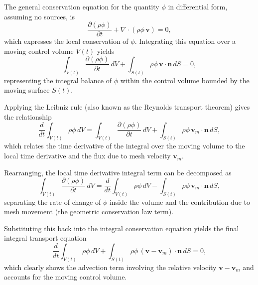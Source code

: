 \documentclass[12pt]{extarticle}
\newcommand{\<}{\langle}
\renewcommand{\>}{\rangle}
\theoremstyle{definition}
\begin{document}
The general conservation equation for the quantity \(\phi\) in differential form, assuming no sources, is
\begin{equation}
\frac{\partial (\rho \phi)}{\partial t} + \nabla \cdot (\rho \phi \, \textbf{v}) = 0,
\end{equation}
which expresses the local conservation of \(\phi\). Integrating this equation over a moving control volume \(V(t)\) yields
\begin{equation}
\int_{V(t)} \frac{\partial (\rho \phi)}{\partial t} \, dV + \int_{S(t)} \rho \phi \, \textbf{v} \cdot \textbf{n} \, dS = 0,
\end{equation}
representing the integral balance of \(\phi\) within the control volume bounded by the moving surface \(S(t)\).

Applying the Leibniz rule (also known as the Reynolds transport theorem) gives the relationship
\begin{equation}
\frac{d}{dt} \int_{V(t)} \rho \phi \, dV = \int_{V(t)} \frac{\partial (\rho \phi)}{\partial t} \, dV + \int_{S(t)} \rho \phi \, \textbf{v}_m \cdot \textbf{n} \, dS,
\end{equation}
which relates the time derivative of the integral over the moving volume to the local time derivative and the flux due to mesh velocity \(\textbf{v}_m\).

Rearranging, the local time derivative integral term can be decomposed as
\begin{equation}
\int_{V(t)} \frac{\partial (\rho \phi)}{\partial t} \, dV = \frac{d}{dt} \int_{V(t)} \rho \phi \, dV - \int_{S(t)} \rho \phi \, \textbf{v}_m \cdot \textbf{n} \, dS,
\end{equation}
separating the rate of change of \(\phi\) inside the volume and the contribution due to mesh movement (the geometric conservation law term).

Substituting this back into the integral conservation equation yields the final integral transport equation
\begin{equation}
\frac{d}{dt} \int_{V(t)} \rho \phi \, dV + \int_{S(t)} \rho \phi \, (\textbf{v} - \textbf{v}_m) \cdot \textbf{n} \, dS = 0,
\end{equation}
which clearly shows the advection term involving the relative velocity \(\textbf{v} - \textbf{v}_m\) and accounts for the moving control volume.
\end{document}

